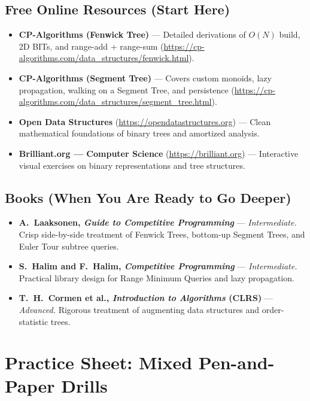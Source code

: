 \documentclass[11pt,a4paper]{article}
\theoremstyle{definition}
\newcounter{exercise}
\begin{document}
\subsection*{Free Online Resources (Start Here)}
\begin{itemize}
    \item \textbf{CP-Algorithms (Fenwick Tree)} --- Detailed derivations of $O(N)$ build, 2D BITs, and range-add + range-sum (\url{https://cp-algorithms.com/data_structures/fenwick.html}).
    \item \textbf{CP-Algorithms (Segment Tree)} --- Covers custom monoids, lazy propagation, walking on a Segment Tree, and persistence (\url{https://cp-algorithms.com/data_structures/segment_tree.html}).
    \item \textbf{Open Data Structures} (\url{https://opendatastructures.org}) --- Clean mathematical foundations of binary trees and amortized analysis.
    \item \textbf{Brilliant.org --- Computer Science} (\url{https://brilliant.org}) --- Interactive visual exercises on binary representations and tree structures.
\end{itemize}

\subsection*{Books (When You Are Ready to Go Deeper)}
\begin{itemize}
    \item \textbf{A.\ Laaksonen, \emph{Guide to Competitive Programming}} --- \emph{Intermediate.} Crisp side-by-side treatment of Fenwick Trees, bottom-up Segment Trees, and Euler Tour subtree queries.
    \item \textbf{S.\ Halim and F.\ Halim, \emph{Competitive Programming}} --- \emph{Intermediate.} Practical library design for Range Minimum Queries and lazy propagation.
    \item \textbf{T.\ H.\ Cormen et al., \emph{Introduction to Algorithms} (CLRS)} --- \emph{Advanced.} Rigorous treatment of augmenting data structures and order-statistic trees.
\end{itemize}

\section*{Practice Sheet: Mixed Pen-and-Paper Drills}
\end{document}
